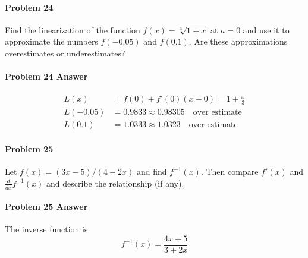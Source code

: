 \documentclass[a4paper, 11pt]{article}
\begin{document}

\paragraph{Problem 24}
Find the linearization of the function $f(x) = \sqrt[3]{1+x}$ at $a=0$ and use it to approximate the numbers $f(-0.05)$ and $f(0.1)$.
Are these approximations overestimates or underestimates?


\paragraph{Problem 24 Answer}
\begin{align}
    L(x) &= f(0) + f'(0)(x-0) = 1 + \frac{x}{3}  \nonumber \\
    L(-0.05) &= 0.9833 \approx 0.98305 \quad \text{over estimate} \nonumber \\
    L(0.1) &= 1.0333 \approx 1.0323 \quad \text{over estimate} \nonumber
\end{align}


\paragraph{Problem 25}
Let $f(x) = (3x-5)/(4-2x)$ and find $f^{-1}(x)$.  Then compare $f'(x)$ and $\frac{d}{dx} f^{-1}(x)$ and describe the relationship (if any).


\paragraph{Problem 25 Answer}
The inverse function is
\[
	f^{-1}(x) = \frac{4x+5}{3+2x}
\]

\end{document}

